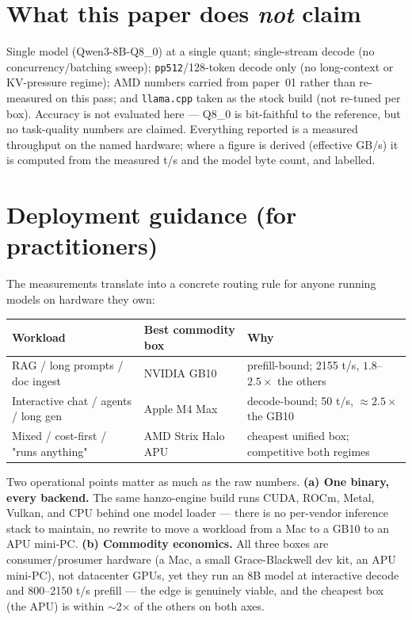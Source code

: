 \documentclass[11pt]{article}
\begin{document}
\section{What this paper does \emph{not} claim}
Single model (Qwen3-8B-Q8\_0) at a single quant; single-stream decode (no concurrency/batching
sweep); \texttt{pp512}/128-token decode only (no long-context or KV-pressure regime); AMD numbers
carried from paper~01 rather than re-measured on this pass; and \texttt{llama.cpp} taken as the
stock build (not re-tuned per box). Accuracy is not evaluated here --- Q8\_0 is bit-faithful to
the reference, but no task-quality numbers are claimed. Everything reported is a measured
throughput on the named hardware; where a figure is derived (effective GB/s) it is computed from
the measured t/s and the model byte count, and labelled.

\section{Deployment guidance (for practitioners)}
The measurements translate into a concrete routing rule for anyone running models on hardware they
own:
\begin{table}[h]
\centering
\begin{tabular}{l l l}
\toprule
Workload & Best commodity box & Why\\
\midrule
RAG / long prompts / doc ingest & NVIDIA GB10 & prefill-bound; 2155 t/s, $1.8$--$2.5\times$ the others\\
Interactive chat / agents / long gen & Apple M4 Max & decode-bound; 50 t/s, $\approx2.5\times$ the GB10\\
Mixed / cost-first / "runs anything" & AMD Strix Halo APU & cheapest unified box; competitive both regimes\\
\bottomrule
\end{tabular}
\end{table}

\noindent Two operational points matter as much as the raw numbers. \textbf{(a) One binary, every
backend.} The same hanzo-engine build runs CUDA, ROCm, Metal, Vulkan, and CPU behind one model
loader --- there is no per-vendor inference stack to maintain, no rewrite to move a workload from a
Mac to a GB10 to an APU mini-PC. \textbf{(b) Commodity economics.} All three boxes are
consumer/prosumer hardware (a Mac, a small Grace-Blackwell dev kit, an APU mini-PC), not datacenter
GPUs, yet they run an 8B model at interactive decode and 800--2150 t/s prefill --- the edge is
genuinely viable, and the cheapest box (the APU) is within $\sim$2$\times$ of the others on both axes.
\end{document}
